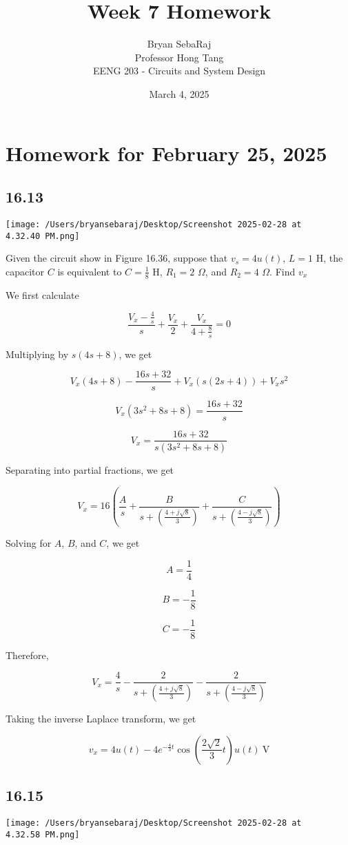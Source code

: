 \documentclass{article}
\title{Week 7 Homework}
\author{Bryan SebaRaj \\[0.7em] Professor Hong Tang \\[0.7em]  EENG 203 - Circuits and System Design}
\date{March 4, 2025}
\begin{document}
\maketitle

\section*{Homework for February 25, 2025}

\subsection*{16.13}
\texttt{[image: /Users/bryansebaraj/Desktop/Screenshot 2025-02-28 at 4.32.40 PM.png]}

Given the circuit show in Figure 16.36, suppose that $v_s=4u(t)$, $L=1$ H, the capacitor $C$ is equivalent to $C= \frac18$ H, $R_1=2$ $\Omega$, and $R_2=4$ $\Omega$. Find $v_x$

We first calculate

$$\frac{V_x - \frac4s}{s}+\frac{V_x}{2}+\frac{V_x}{4+\frac8s}=0$$

Multiplying by $s(4s+8)$, we get

$$V_x(4s+8) - \frac{16s+32}{s}+V_x(s(2s+4)) + V_xs^2$$

$$V_x(3s^2 + 8s + 8) = \frac{16s+32}{s}$$

$$V_x = \frac{16s+32}{s(3s^2 + 8s + 8)}$$

Separating into partial fractions, we get

$$V_x = 16\left(\frac{A}{s} + \frac{B}{s + \left( \frac{4 + j\sqrt{8}}{3} \right)} + \frac{C}{s + \left( \frac{4 - j\sqrt{8}}{3} \right)}\right)$$

Solving for $A$, $B$, and $C$, we get

$$A = \frac{1}{4}$$

$$B = -\frac18$$

$$C = -\frac18$$

Therefore,

$$V_x = \frac{4}{s} - \frac{2}{s + \left( \frac{4 + j\sqrt{8}}{3} \right)} - \frac{2}{s + \left( \frac{4 - j\sqrt{8}}{3} \right)}$$

Taking the inverse Laplace transform, we get

$$v_x = 4u(t) - 4e^{-\frac43t}\cos\left(\frac{2\sqrt{2}}{3}t\right)u(t) \ \text{V}$$




\subsection*{16.15}
\texttt{[image: /Users/bryansebaraj/Desktop/Screenshot 2025-02-28 at 4.32.58 PM.png]}
\end{document}
